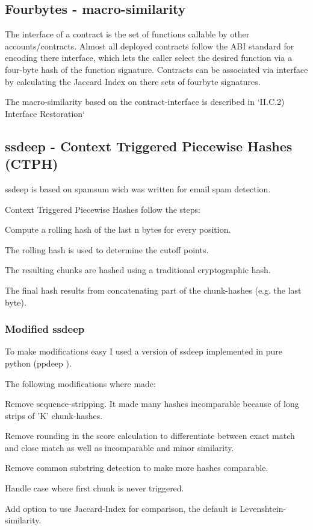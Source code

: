 \documentclass[../main.tex]{subfiles}
\begin{document}

\subsection{Fourbytes - macro-similarity}

The interface of a contract is the set of functions callable by other accounts/contracts.
Almost all deployed contracts follow the ABI standard for encoding there interface, which lets the caller select the desired function via a four-byte hash of the function signature.
Contracts can be associated via interface by calculating the Jaccard Index on there sets of fourbyte signatures.

The macro-similarity based on the contract-interface is described in `II.C.2) Interface Restoration` 

\subsection{ssdeep - Context Triggered Piecewise Hashes (CTPH)}
ssdeep is based on spamsum\cite{spamsum} wich was written for email spam detection.

Context Triggered Piecewise Hashes follow the steps:
\begin{ol}
  \item Compute a rolling hash of the last n bytes for every position.
  \item The rolling hash is used to determine the cutoff points.
  \item The resulting chunks are hashed using a traditional cryptographic hash.
  \item The final hash results from concatenating part of the chunk-hashes (e.g. the last byte).
\end{ol}

\subsubsection{Modified ssdeep}
To make modifications easy I used a version of ssdeep implemented in pure python (ppdeep \cite{ppdeep}).

The following modifications where made:
\begin{ul}
  \item Remove sequence-stripping. It made many hashes incomparable because of long strips of 'K' chunk-hashes.
  \item Remove rounding in the score calculation to differentiate between exact match and close match as well as incomparable and minor similarity.
  \item Remove common substring detection to make more hashes comparable.
  \item Handle case where first chunk is never triggered.
  \item Add option to use Jaccard-Index for comparison, the default is Levenshtein-similarity.
\end{ul}
\end{document}
